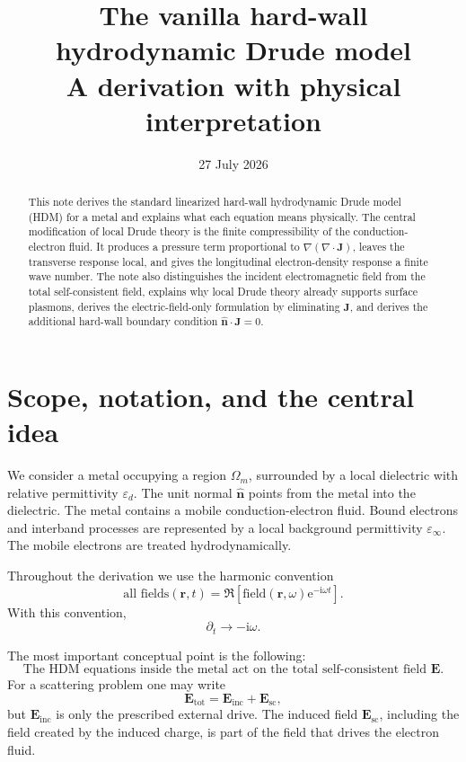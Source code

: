 \documentclass[11pt,a4paper]{article}
\title{\textbf{The vanilla hard-wall hydrodynamic Drude model}\\
\large A derivation with physical interpretation}
\author{}
\date{27 July 2026}
\newcommand{\E}{\mathbf E}
\newcommand{\J}{\mathbf J}
\newcommand{\nvec}{\hat{\mathbf n}}
\newcommand{\ee}{\mathrm e}
\newcommand{\ii}{\mathrm i}
\newcommand{\epsinf}{\varepsilon_\infty}
\newcommand{\epsd}{\varepsilon_d}
\begin{document}
\maketitle

\begin{abstract}
This note derives the standard linearized hard-wall hydrodynamic Drude model
(HDM) for a metal and explains what each equation means physically.  The
central modification of local Drude theory is the finite compressibility of the
conduction-electron fluid.  It produces a pressure term proportional to
\(\nabla(\nabla\!\cdot\!\J)\), leaves the transverse response local, and gives
the longitudinal electron-density response a finite wave number.  The note
also distinguishes the incident electromagnetic field from the total
self-consistent field, explains why local Drude theory already supports surface
plasmons, derives the electric-field-only formulation by eliminating \(\J\),
and derives the additional hard-wall boundary condition \(\nvec\!\cdot\!\J=0\).
\end{abstract}

\tableofcontents

\section{Scope, notation, and the central idea}

We consider a metal occupying a region \(\Omega_m\), surrounded by a local
dielectric with relative permittivity \(\epsd\).  The unit normal \(\nvec\)
points from the metal into the dielectric.  The metal contains a mobile
conduction-electron fluid.  Bound electrons and interband processes are
represented by a local background permittivity \(\epsinf\).  The mobile
electrons are treated hydrodynamically.

Throughout the derivation we use the harmonic convention
\begin{equation}
    \text{all fields}(\mathbf r,t)=\Re\!\left[\text{field}(\mathbf r,\omega)
    \ee^{-\ii\omega t}\right].
    \label{eq:time-convention}
\end{equation}
With this convention,
\begin{equation}
    \partial_t\longrightarrow-\ii\omega.
    \label{eq:dt-rule}
\end{equation}

The most important conceptual point is the following:
\begin{equation}
    \boxed{\text{The HDM equations inside the metal act on the total
    self-consistent field }\E.}
    \label{eq:total-field-box}
\end{equation}
For a scattering problem one may write
\begin{equation}
    \E_{\mathrm{tot}}=\E_{\mathrm{inc}}+\E_{\mathrm{sc}},
    \label{eq:incident-total}
\end{equation}
but \(\E_{\mathrm{inc}}\) is only the prescribed external drive.  The
induced field \(\E_{\mathrm{sc}}\), including the field created by the induced
charge, is part of the field that drives the electron fluid.
\end{document}
